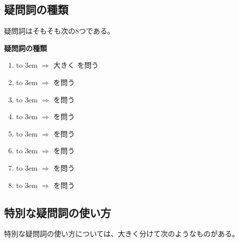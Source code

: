 \subsection{疑問詞の種類}
    疑問詞はそもそも次の8つである。

    \begin{definitionbox}{\textbf{疑問詞の種類}}
        \begin{enumerate}
            \item {}\hbox to 3em{\dotfill\hss}
            $\Longrightarrow$ 大きく  を問う
            \item {}\hbox to 3em{\dotfill\hss}
            $\Longrightarrow$  を問う
            \item {}\hbox to 3em{\dotfill\hss}
            $\Longrightarrow$  を問う
            \item {}\hbox to 3em{\dotfill\hss}
            $\Longrightarrow$  を問う
            \item {}\hbox to 3em{\dotfill\hss}
            $\Longrightarrow$  を問う
            \item {}\hbox to 3em{\dotfill\hss}
            $\Longrightarrow$  を問う
            \item {}\hbox to 3em{\dotfill\hss}
            $\Longrightarrow$  を問う
            \item {}\hbox to 3em{\dotfill\hss}
            $\Longrightarrow$  を問う
        \end{enumerate}
    \end{definitionbox}

\subsection{特別な疑問詞の使い方}
    特別な疑問詞の使い方については、大きく分けて次のようなものがある。

